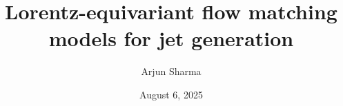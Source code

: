 



\title[Lorentz-equivariant jet generation]{Lorentz-equivariant flow matching models for jet generation}

\author[]{Arjun Sharma}

\vspace{-2cm}\date{August 6, 2025}
